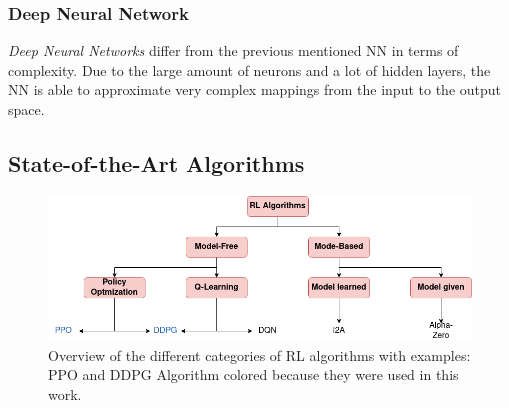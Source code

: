 \subsubsection{Deep Neural Network}
\emph{Deep Neural Networks} differ from the previous mentioned NN in terms of complexity. 
Due to the large amount of neurons and a lot of hidden layers, the NN is able to approximate very complex mappings from the input to the output space.


\subsection{State-of-the-Art Algorithms}
\begin{figure}
	\centering
	\includegraphics[width=\linewidth]{figures/algo.png}
	\caption{Overview of the different categories of RL algorithms with examples: PPO and DDPG Algorithm colored because they were used in this work.}
	\label{fig:algo}
\end{figure}

